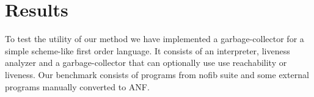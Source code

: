 \documentclass[9pt]{sigplanconf}
\newcommand{\comment}[1]{{\color{Myblue}{(#1)}}}
\begin{document}







\section{Results}

To test the utility of our method we have implemented a garbage-collector 
for a simple scheme-like first order language. It consists of an interpreter, 
liveness analyzer and a garbage-collector that can optionally use use reachability or liveness. 
Our benchmark consists of programs from nofib suite and some external programs manually converted to ANF. 
\end{document}
